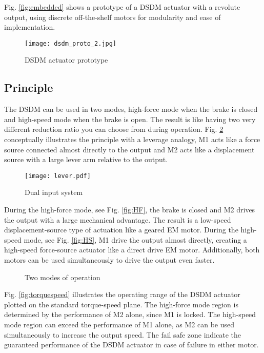 Fig. \ref{fig:embedded} shows a prototype of a DSDM actuator with a revolute output, using discrete off-the-shelf motors for modularity and ease of implementation.

\begin{figure}[H]
	\centering
		\texttt{[image: dsdm\_proto\_2.jpg]}
	\caption{DSDM actuator prototype}
	\label{fig:dsdm_proto}
\end{figure}


\subsection{Principle}
\label{sec:princ}



The DSDM can be used in two modes, high-force mode when the brake is closed and high-speed mode when the brake is open. The result is like having two very different reduction ratio you can choose from during operation. Fig. \ref{fig:lever} conceptually illustrates the principle with a leverage analogy, M1 acts like a force source connected almost directly to the output and M2 acts like a displacement source with a large lever arm relative to the output. 
%
\begin{figure}[H]
	\centering
		\texttt{[image: lever.pdf]}
	\caption{Dual input system}
	\label{fig:lever}
\end{figure}
%
During the high-force mode, see Fig. \ref{fig:HF}, the brake is closed and M2 drives the output with a large mechanical advantage. The result is a low-speed displacement-source type of actuation like a geared EM motor. During the high-speed mode, see Fig. \ref{fig:HS}, M1 drive the output almost directly, creating a high-speed force-source actuator like a direct drive EM motor. Additionally, both motors can be used simultaneously to drive the output even faster.
%
\begin{figure}[H]
        \centering
        \caption{Two modes of operation}\label{fig:opmode}
\end{figure}

Fig. \ref{fig:torquespeed} illustrates the operating range of the DSDM actuator plotted on the standard torque-speed plane. The high-force mode region is determined by the performance of M2 alone, since M1 is locked. The high-speed mode region can exceed the performance of M1 alone, as M2 can be used simultaneously to increase the output speed. The fail safe zone indicate the guaranteed performance of the DSDM actuator in case of failure in either motor. 


